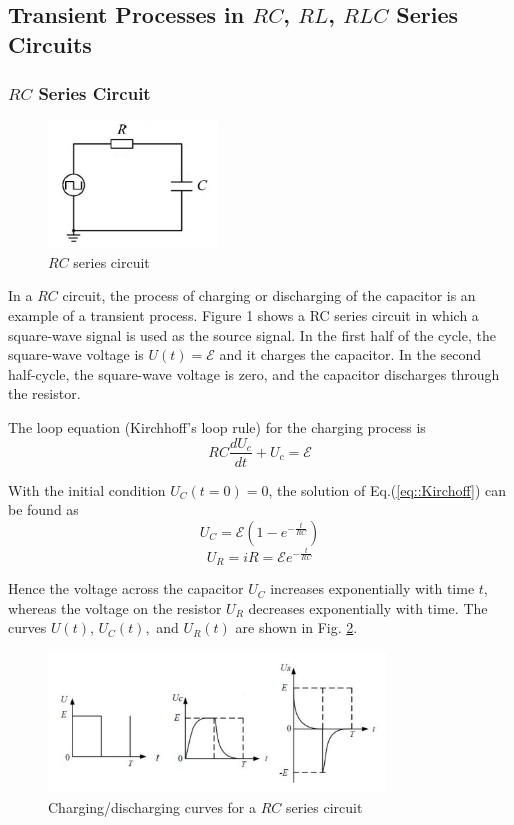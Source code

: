 \documentclass[a4paper]{article}
\begin{document}
\subsection{Transient Processes in $RC$, $RL$, $RLC$ Series Circuits}

\subsubsection{$RC$ Series Circuit}

\begin{figure}[!htbp]
	\center
	\includegraphics[width=0.4\textwidth]{RC_series_circuit.png}
	\caption{$RC$ series circuit}
	\label{fig::RC_series}
\end{figure}

In a $RC$ circuit, the process of charging or discharging of the capacitor is an example of a transient process. Figure 1 shows a RC series circuit in which a square-wave signal is used as the source signal. In the first half of the cycle, the square-wave voltage is $U(t) = \mathcal{E}$ and it charges the capacitor. In the second half-cycle, the square-wave voltage is zero, and the capacitor discharges through the resistor.

The loop equation (Kirchhoff’s loop rule) for the charging process is
\begin{equation}
	RC\frac{dU_c}{dt}+U_c=\mathcal{E}
	\label{eq::Kirchoff}
\end{equation}

With the initial condition $U_C(t = 0) = 0$, the solution of Eq.(\ref{eq::Kirchoff}) can be found as
$$U_C=\mathcal{E}(1-e^{-\frac{t}{RC}})$$
$$U_R=iR=\mathcal{E} e^{-\frac{t}{RC}}$$

Hence the voltage across the capacitor $U_C$ increases exponentially with time $t$, whereas the voltage on the resistor $U_R$ decreases exponentially with time. The curves $U(t)$, $U_C(t),$ and $U_R(t)$ are shown in Fig. \ref{fig::charging_discharging}.

\begin{figure}[!htbp]
	\center
	\includegraphics[width=0.8\textwidth]{charging_discharing.png}
	\caption{Charging/discharging curves for a $RC$ series circuit}
	\label{fig::charging_discharging}
\end{figure}
\end{document}
